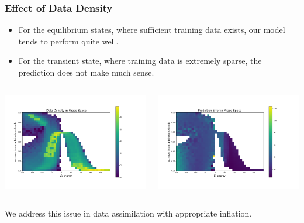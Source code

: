 \documentclass{beamer}
\begin{document}
\begin{frame}
\frametitle{Effect of Data Density}
\begin{itemize}
	\item For the equilibrium states, where sufficient training data exists, our model tends to perform quite well.
	\item For the transient state, where training data is extremely sparse, the prediction does not make much sense.
\end{itemize}
\begin{columns}
\begin{column}{0.5\linewidth}
\centering
\includegraphics[width=\linewidth]{Figures/DensityMatrix.png}
\end{column}
\begin{column}{0.5\linewidth}
\centering
\includegraphics[width=\linewidth]{Figures/ErrorMatrix.png}
\end{column}
\end{columns}
We address this issue in data assimilation with appropriate inflation.
\end{frame}
\end{document}
